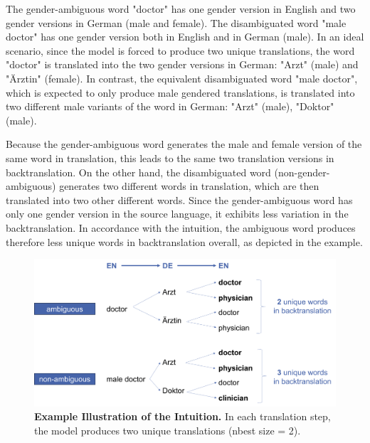 The gender-ambiguous word "doctor" has one gender version in English and two gender versions in German (male and female). The disambiguated word "male doctor" has one gender version both in English and in German (male). In an ideal scenario, since the model is forced to produce two unique translations, the word "doctor" is translated into the two gender versions in German: "Arzt" (male) and "Ärztin" (female). In contrast, the equivalent disambiguated word "male doctor", which is expected to only produce male gendered translations, is translated into two different male variants of the word in German: "Arzt" (male), "Doktor" (male). 

Because the gender-ambiguous word generates the male and female version of the same word in translation, this leads to the same two translation versions in backtranslation. On the other hand, the disambiguated word (non-gender-ambiguous) generates two different words in translation, which are then translated into two other different words. Since the gender-ambiguous word has only one gender version in the source language, it exhibits less variation in the backtranslation. In accordance with the intuition, the ambiguous word produces therefore less unique words in backtranslation overall, as depicted in the example.


\begin{figure}
  \centering
  \includegraphics[scale=0.45]{figures/intuition.png}
  \caption{\textbf{Example Illustration of the Intuition.} In each translation step, the model produces two unique translations (nbest size = 2).}
  \label{fig:intuition}
\end{figure}



